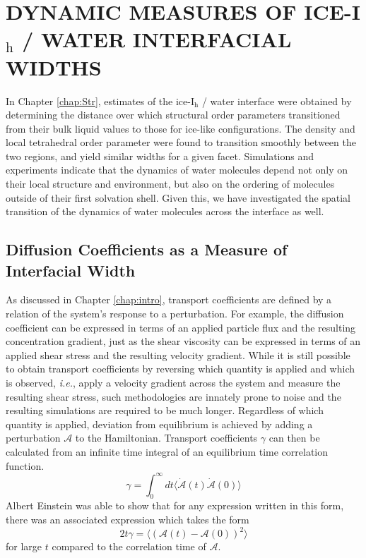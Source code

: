 \chapter{DYNAMIC MEASURES OF ICE-I$_\mathrm{h}$ / WATER INTERFACIAL WIDTHS}\label{chap:Dyn}
In Chapter \ref{chap:Str}, estimates of the ice-I$_\mathrm{h}$ / water
interface were obtained by determining the distance over which
structural order parameters transitioned from their bulk liquid values
to those for ice-like configurations. The density and local
tetrahedral order parameter were found to transition smoothly between
the two regions, and yield similar widths for a given facet.
Simulations and experiments indicate that the dynamics of water
molecules depend not only on their local structure and environment,
but also on the ordering of molecules outside of their first solvation
shell. Given this, we have investigated the spatial transition of the
dynamics of water molecules across the interface as well.

\section{Diffusion Coefficients as a Measure of Interfacial Width}
As discussed in Chapter \ref{chap:intro}, transport coefficients are
defined by a relation of the system's response to a perturbation. For
example, the diffusion coefficient can be expressed in terms of an
applied particle flux and the resulting concentration gradient, just
as the shear viscosity can be expressed in terms of an applied shear
stress and the resulting velocity gradient. While it is still possible
to obtain transport coefficients by reversing which quantity is
applied and which is observed, \textit{i.e.}, apply a velocity
gradient across the system and measure the resulting shear stress,
such methodologies are innately prone to noise and the resulting
simulations are required to be much longer. Regardless of which
quantity is applied, deviation from equilibrium is achieved by adding
a perturbation $\mathscr{A}$ to the Hamiltonian.  Transport
coefficients $\gamma$ can then be calculated from an infinite time
integral of an equilibrium time correlation function.
\begin{equation}\label{eq:transport1}
\gamma = \int_0^{\infty} dt \langle \dot{\mathscr{A}}(t)
\dot{\mathscr{A}}(0)\rangle 
\end{equation}
Albert Einstein was able to show that for any expression written in
this form, there was an associated expression which takes the form
\begin{equation}\label{eq:transport2}
2t\gamma = \langle (\mathscr{A}(t)-\mathscr{A}(0))^2 \rangle
\end{equation}
for large $t$ compared to the correlation time of $\mathscr{A}$. 

